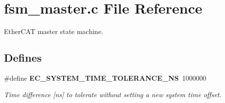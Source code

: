 \section{fsm\-\_\-master.\-c \-File \-Reference}
\label{fsm__master_8c}


\-Ether\-C\-A\-T master state machine.  


\subsection*{\-Defines}
\begin{DoxyCompactItemize}
\item 
\#define {\bf \-E\-C\-\_\-\-S\-Y\-S\-T\-E\-M\-\_\-\-T\-I\-M\-E\-\_\-\-T\-O\-L\-E\-R\-A\-N\-C\-E\-\_\-\-N\-S}~1000000\label{fsm__master_8c_a997e9f2ec2485eb23e2ff0831547b772}

\begin{DoxyCompactList}\small\item\em \-Time difference [ns] to tolerate without setting a new system time offset. \end{DoxyCompactList}\end{DoxyCompactItemize}
